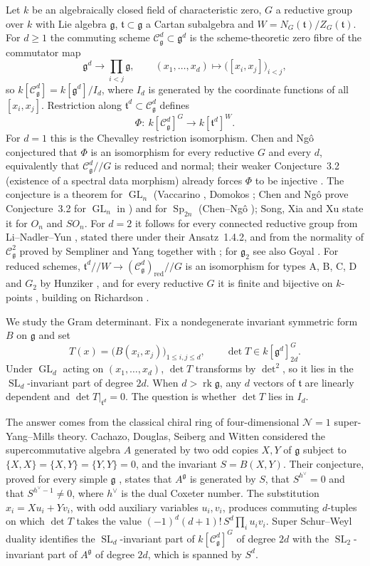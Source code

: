 \documentclass[11pt]{article}
\theoremstyle{definition}
\newcommand{\g}{\mathfrak g}
\newcommand{\h}{\mathfrak t}
\newcommand{\Cs}{\mathcal C}
\newcommand{\rk}{\operatorname{rk}}
\newcommand{\hv}{h^\vee}
\DeclareMathOperator{\GL}{GL}
\DeclareMathOperator{\SL}{SL}
\DeclareMathOperator{\Sp}{Sp}
\begin{document}
Let $k$ be an algebraically closed field of characteristic zero, $G$ a reductive group over $k$ with Lie algebra $\g$, $\h\subset\g$ a Cartan subalgebra and $W=N_G(\h)/Z_G(\h)$. For $d\ge1$ the commuting scheme $\Cs^d_\g\subset\g^d$ is the scheme-theoretic zero fibre of the commutator map
\[
\g^d\longrightarrow\prod_{i<j}\g,\qquad (x_1,\dots,x_d)\longmapsto\bigl([x_i,x_j]\bigr)_{i<j},
\]
so $k[\Cs^d_\g]=k[\g^d]/I_d$, where $I_d$ is generated by the coordinate functions of all $[x_i,x_j]$. Restriction along $\h^d\subset\Cs^d_\g$ defines
\[
\Phi:\ k[\Cs^d_\g]^G\longrightarrow k[\h^d]^W .
\]
For $d=1$ this is the Chevalley restriction isomorphism. Chen and Ng\^o \cite[Conj.~3.1]{CN20} conjectured that $\Phi$ is an isomorphism for every reductive $G$ and every $d$, equivalently that $\Cs^d_\g/\!\!/G$ is reduced and normal; their weaker Conjecture~3.2 (existence of a spectral data morphism) already forces $\Phi$ to be injective \cite[\S3]{CN20}. The conjecture is a theorem for $\GL_n$ (Vaccarino \cite{Va07}, Domokos \cite{Do09}; Chen and Ng\^o prove Conjecture~3.2 for $\GL_n$ in \cite[Thm.~3.3]{CN20}) and for $\Sp_{2n}$ (Chen--Ng\^o \cite[Thm.~4.1]{CN21}); Song, Xia and Xu \cite[Thm.~1.2]{SXX23} state it for $O_n$ and $SO_n$. For $d=2$ it follows for every connected reductive group from Li--Nadler--Yun \cite[Thm.~1.4.11]{LNY24}, stated there under their Ansatz~1.4.2, and from the normality of $\Cs^2_\g$ proved by Sempliner and Yang \cite{SY26} together with \cite[\S3]{CN20}; for $\g_2$ see also Goyal \cite{Go26}. For reduced schemes, $\h^d/\!\!/W\to(\Cs^d_{\g})_{\mathrm{red}}/\!\!/G$ is an isomorphism for types A, B, C, D and $G_2$ by Hunziker \cite{Hu97}, and for every reductive $G$ it is finite and bijective on $k$-points \cite[Thms.~6.2, 6.3]{Hu97}, building on Richardson \cite{Ri88}.

We study the Gram determinant. Fix a nondegenerate invariant symmetric form $B$ on $\g$ and set
\[
T(x)=\bigl(B(x_i,x_j)\bigr)_{1\le i,j\le d},\qquad \det T\in k[\g^d]^{G}_{2d}.
\]
Under $\GL_d$ acting on $(x_1,\dots,x_d)$, $\det T$ transforms by $\det^2$, so it lies in the $\SL_d$-invariant part of degree $2d$. When $d>\rk\g$, any $d$ vectors of $\h$ are linearly dependent and $\det T|_{\h^d}=0$. The question is whether $\det T$ lies in $I_d$.

The answer comes from the classical chiral ring of four-dimensional $\mathcal N=1$ super-Yang--Mills theory. Cachazo, Douglas, Seiberg and Witten \cite{CDSW} considered the supercommutative algebra $A$ generated by two odd copies $X,Y$ of $\g$ subject to $\{X,X\}=\{X,Y\}=\{Y,Y\}=0$, and the invariant $S=B(X,Y)$. Their conjecture, proved for every simple $\g$ \cite{CDSW,Wi03,EK03,Et03,Ku08,CF23}, states that $A^\g$ is generated by $S$, that $S^{\hv}=0$ and that $S^{\hv-1}\neq0$, where $\hv$ is the dual Coxeter number. The substitution $x_i=Xu_i+Yv_i$, with odd auxiliary variables $u_i,v_i$, produces commuting $d$-tuples on which $\det T$ takes the value $(-1)^d(d+1)!\,S^d\prod_iu_iv_i$. Super Schur--Weyl duality identifies the $\SL_d$-invariant part of $k[\Cs^d_\g]^G$ of degree $2d$ with the $\SL_2$-invariant part of $A^\g$ of degree $2d$, which is spanned by $S^d$.
\end{document}
